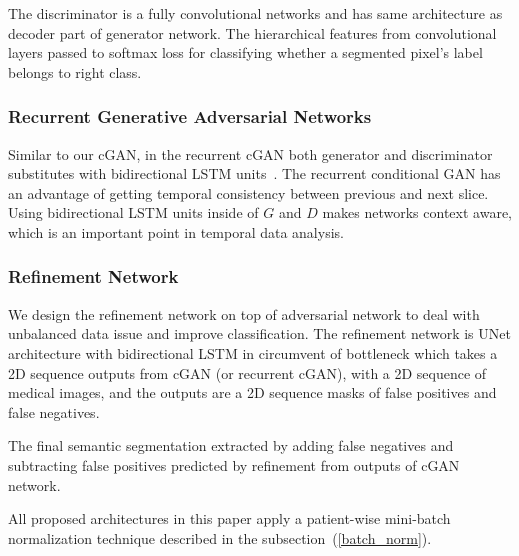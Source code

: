 \documentclass[10pt,twocolumn,letterpaper]{article}
\begin{document}
The discriminator is a fully convolutional networks and has same architecture as decoder part of generator network. The hierarchical features from convolutional layers passed to softmax loss for classifying whether a segmented pixel's label belongs to right class.

\subsubsection{Recurrent Generative Adversarial Networks}\label{method_sec1b}
Similar to our cGAN, in the recurrent cGAN both generator and discriminator substitutes with bidirectional LSTM units~\cite{graves2005framewise}.
The recurrent conditional GAN has an advantage of getting temporal consistency between previous and next slice.
Using bidirectional LSTM units inside of $G$ and $D$ makes networks context aware, which is an important point in temporal data analysis. 

\subsubsection{Refinement Network}\label{refarch}

We design the refinement network on top of adversarial network to deal with unbalanced data issue and improve classification. The refinement network is UNet architecture with bidirectional LSTM in circumvent of bottleneck which takes a 2D sequence outputs from cGAN (or recurrent cGAN), with a 2D sequence of medical images, and the outputs are a 2D sequence masks of false positives and false negatives.

The final semantic segmentation extracted by adding false negatives and subtracting false positives predicted by refinement from outputs of cGAN network.

All proposed architectures in this paper apply a patient-wise mini-batch normalization technique described in the subsection~(\ref{batch_norm}).
\end{document}
